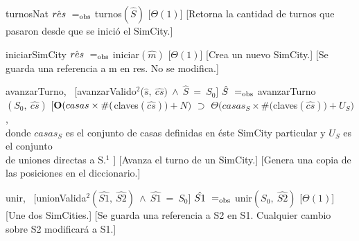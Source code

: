 \begin{Interfaz}
    \InterfazFuncion
    {turnos}{}{Nat}
    {$\hat{res}\ \igobs\ $turnos$(\hat{S})$}
    [$\Theta(1)$]
    [Retorna la cantidad de turnos que pasaron desde que se inició el SimCity.]

    \InterfazFuncion
    {iniciar}{}{SimCity}
    {$\hat{res}\ \igobs\ $iniciar$(\hat{m})$}
    [$\Theta(1)$]
    [Crea un nuevo SimCity.]
    [Se guarda una referencia a m en res. No se modifica.]

    \InterfazFuncion
    {avanzarTurno}{,\ }{}
    [avanzarValido$^{2}$($\hat{s},\ \hat{cs})\ \land\ \hat{S}\ =\ S_0$]
    {$\hat{S}\ \igobs\ $avanzarTurno$(S_0,\ \hat{cs})$}
    [$\bold{O}(casas \times \#($claves$(\hat{cs})) + N)$ $\supset$ $\Theta(casas_{S} \times \#($claves$(\hat{cs})) + U_S)$, \\ \tab
        donde $casas_{S}$ es el conjunto de casas definidas en éste SimCity particular y $U_S$ es el conjunto \\
        \tab de uniones directas a S.$^{1}$
    ]
    [Avanza el turno de un SimCity.]
    [Genera una copia de las posiciones en el diccionario.]

    \InterfazFuncion
    {unir}{,\ }{}
    [unionValida$^{2}(\hat{S1},\ \hat{S2})\ \land\ \hat{S1}\ =\ S_0$]
    {$\hat{S1}\ \igobs\ $unir$(S_0,\ \hat{S2})$}
    [$\Theta(1)$]
    [Une dos SimCities.]
    [Se guarda una referencia a S2 en S1. Cualquier cambio sobre S2 modificará a S1.]

    \vfill{}
\end{Interfaz}